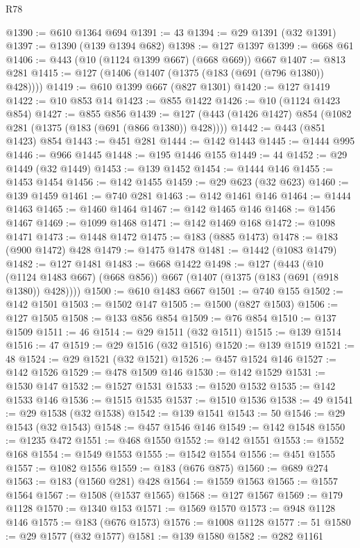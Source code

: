 \begin{lexlean}{R78}
\begin{coremodule}
@1390 := @610 @1364 @694
@1391 := 43
@1394 := @29 @1391 (@32 @1391)
@1397 := @1390 (@139 @1394 @682)
@1398 := @127 @1397
@1399 := @668 @61
@1406 := @443 (@10 (@1124 @1399 @667) (@668 @669)) @667
@1407 := @813 @281
@1415 := @127 (@1406 (@1407 (@1375 (@183 (@691 (@796 @1380)) @428))))
@1419 := @610 @1399 @667 (@827 @1301)
@1420 := @127 @1419
@1422 := @10 @853 @14
@1423 := @855 @1422
@1426 := @10 (@1124 @1423 @854)
@1427 := @855 @856
@1439 := @127 (@443 (@1426 @1427) @854 (@1082 @281 (@1375 (@183 (@691 (@866 @1380)) @428))))
@1442 := @443 (@851 @1423) @854
@1443 := @451 @281
@1444 := @142 @1443
@1445 := @1444 @995
@1446 := @966 @1445
@1448 := @195 @1446 @155
@1449 := 44
@1452 := @29 @1449 (@32 @1449)
@1453 := @139 @1452
@1454 := @1444 @146
@1455 := @1453 @1454
@1456 := @142 @1455
@1459 := @29 @623 (@32 @623)
@1460 := @139 @1459
@1461 := @740 @281
@1463 := @142 @1461 @146
@1464 := @1444 @1463
@1465 := @1460 @1464
@1467 := @142 @1465 @146
@1468 := @1456 @1467
@1469 := @1099 @1468
@1471 := @142 @1469 @168
@1472 := @1098 @1471
@1473 := @1448 @1472
@1475 := @183 (@885 @1473)
@1478 := @183 (@900 @1472) @428
@1479 := @1475 @1478
@1481 := @1442 (@1083 @1479)
@1482 := @127 @1481
@1483 := @668 @1422
@1498 := @127
    (@443 (@10 (@1124 @1483 @667) (@668 @856)) @667 (@1407 (@1375 (@183 (@691 (@918 @1380)) @428))))
@1500 := @610 @1483 @667
@1501 := @740 @155
@1502 := @142 @1501
@1503 := @1502 @147
@1505 := @1500 (@827 @1503)
@1506 := @127 @1505
@1508 := @133 @856 @854
@1509 := @76 @854
@1510 := @137 @1509
@1511 := 46
@1514 := @29 @1511 (@32 @1511)
@1515 := @139 @1514
@1516 := 47
@1519 := @29 @1516 (@32 @1516)
@1520 := @139 @1519
@1521 := 48
@1524 := @29 @1521 (@32 @1521)
@1526 := @457 @1524 @146
@1527 := @142 @1526
@1529 := @478 @1509 @146
@1530 := @142 @1529
@1531 := @1530 @147
@1532 := @1527 @1531
@1533 := @1520 @1532
@1535 := @142 @1533 @146
@1536 := @1515 @1535
@1537 := @1510 @1536
@1538 := 49
@1541 := @29 @1538 (@32 @1538)
@1542 := @139 @1541
@1543 := 50
@1546 := @29 @1543 (@32 @1543)
@1548 := @457 @1546 @146
@1549 := @142 @1548
@1550 := @1235 @472
@1551 := @468 @1550
@1552 := @142 @1551
@1553 := @1552 @168
@1554 := @1549 @1553
@1555 := @1542 @1554
@1556 := @451 @1555
@1557 := @1082 @1556
@1559 := @183 (@676 @875)
@1560 := @689 @274
@1563 := @183 (@1560 @281) @428
@1564 := @1559 @1563
@1565 := @1557 @1564
@1567 := @1508 (@1537 @1565)
@1568 := @127 @1567
@1569 := @179 @1128
@1570 := @1340 @153
@1571 := @1569 @1570
@1573 := @948 @1128 @146
@1575 := @183 (@676 @1573)
@1576 := @1008 @1128
@1577 := 51
@1580 := @29 @1577 (@32 @1577)
@1581 := @139 @1580
@1582 := @282 @1161

\end{coremodule}
\end{lexlean}
